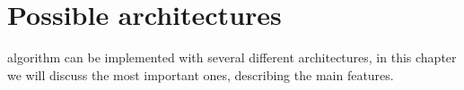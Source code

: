 \chapter{Possible architectures}\label{ch:arches}

\cordic{} algorithm can be implemented with several different architectures,
in this chapter we will discuss the most important ones, describing the main
features.




